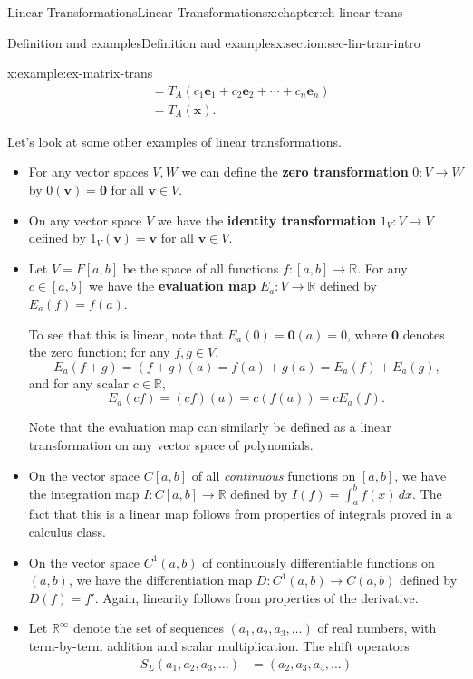\documentclass[oneside,10pt,]{book}
\newcommand{\terminology}[1]{\textbf{#1}}
\numberwithin{equation}{section}
\newcommand{\R}{\mathbb{R}}
\newcommand{\vv}{\mathbf{v}}
\newcommand{\xx}{\mathbf{x}}
\newcommand{\amp}{&}
\begin{document}
\begin{chapterptx}{Linear Transformations}{}{Linear Transformations}{}{}{x:chapter:ch-linear-trans}
\begin{sectionptx}{Definition and examples}{}{Definition and examples}{}{}{x:section:sec-lin-tran-intro}
\begin{example}{}{x:example:ex-matrix-trans}
\begin{align*}
\amp = T_A(c_1\mathbf{e}_1+c_2\mathbf{e}_2+\cdots + c_n\mathbf{e}_n) \\
\amp = T_A(\xx)\text{.}
\end{align*}
%
\end{example}
Let's look at some other examples of linear transformations.%
\begin{itemize}[label=\textbullet]
\item{}For any vector spaces \(V,W\) we can define the \terminology{zero transformation} \(0:V\to W\) by \(0(\vv)=\mathbf{0}\) for all \(\vv\in V\).%
\item{}On any vector space \(V\) we have the \terminology{identity transformation} \(1_V:V\to V\) defined by \(1_V(\vv)=\vv\) for all \(\vv\in V\).%
\item{}Let \(V = F[a,b]\) be the space of all functions \(f:[a,b]\to \R\). For any \(c\in [a,b]\) we have the \terminology{evaluation map} \(E_a: V\to \R\) defined by \(E_a(f) = f(a)\).%
\par
To see that this is linear, note that \(E_a(0)=\mathbf{0}(a)=0\), where \(\mathbf{0}\) denotes the zero function; for any \(f,g\in V\),%
\begin{equation*}
E_a(f+g)=(f+g)(a)=f(a)+g(a)=E_a(f)+E_a(g)\text{,}
\end{equation*}
and for any scalar \(c\in \R\),%
\begin{equation*}
E_a(cf) = (cf)(a) = c(f(a))=cE_a(f)\text{.}
\end{equation*}
%
\par
Note that the evaluation map can similarly be defined as a linear transformation on any vector space of polynomials.%
\item{}On the vector space \(C[a,b]\) of all \emph{continuous} functions on \([a,b]\), we have the integration map \(I:C[a,b]\to \R\) defined by \(I(f)=\int_a^b f(x)\,dx\). The fact that this is a linear map follows from properties of integrals proved in a calculus class.%
\item{}On the vector space \(C^1(a,b)\) of continuously differentiable functions on \((a,b)\), we have the differentiation map \(D: C^1(a,b)\to C(a,b)\) defined by \(D(f) = f'\). Again, linearity follows from properties of the derivative.%
\item{}Let \(\R^\infty\) denote the set of sequences \((a_1,a_2,a_3,\ldots)\) of real numbers, with term-by-term addition and scalar multiplication. The shift operators%
\begin{align*}
S_L(a_1,a_2,a_3,\ldots)  \amp = (a_2,a_3,a_4,\ldots) \\

\end{align*}
\end{itemize}
\end{sectionptx}
\end{chapterptx}
\end{document}
